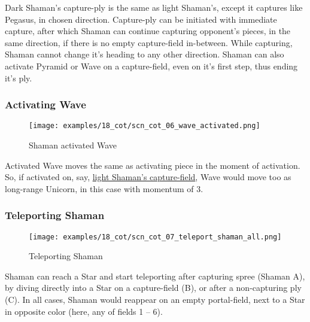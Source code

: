 Dark Shaman's capture-ply is the same as light Shaman's, except it captures like
Pegasus, in chosen direction. Capture-ply can be initiated with immediate capture,
after which Shaman can continue capturing opponent's pieces, in the same direction,
if there is no empty capture-field in-between. While capturing, Shaman cannot change
it's heading to any other direction. Shaman can also activate Pyramid or Wave on a
capture-field, even on it's first step, thus ending it's ply.

\clearpage %

\subsubsection*{Activating Wave}

\noindent
\begin{figure}[!h]
\texttt{[image: examples/18\_cot/scn\_cot\_06\_wave\_activated.png]}
\caption{Shaman activated Wave}
\label{fig:scn_cot_06_wave_activated}
\end{figure}

Activated Wave moves the same as activating piece in the moment of activation.
So, if activated on, say,
\hyperref[fig:scn_cot_03_light_shaman_capture_ply]{light Shaman's capture-field},
Wave would move too as long-range Unicorn, in this case with momentum of 3.

\clearpage %

\subsubsection*{Teleporting Shaman}

\noindent
\begin{figure}[!h]
\texttt{[image: examples/18\_cot/scn\_cot\_07\_teleport\_shaman\_all.png]}
\caption{Teleporting Shaman}
\label{fig:scn_cot_07_teleport_shaman_all}
\end{figure}

Shaman can reach a Star and start teleporting after capturing spree (Shaman A),
by diving directly into a Star on a capture-field (B), or after a non-capturing
ply (C). In all cases, Shaman would reappear on an empty portal-field, next to a
Star in opposite color (here, any of fields 1 -- 6).

